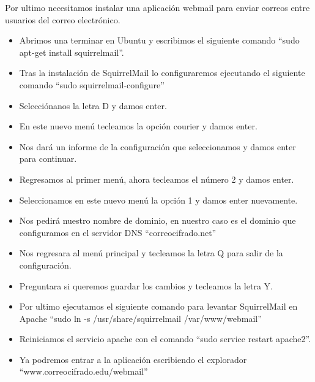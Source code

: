 \documentclass[12pt,oneside,onecolumn,openany]{report}
\begin{document}
Por ultimo necesitamos instalar una aplicación webmail para enviar correos entre usuarios del correo electrónico.
\begin{itemize}
 \item Abrimos una terminar en Ubuntu y escribimos el siguiente comando “sudo apt-get install squirrelmail”.
 \item Tras la instalación de SquirrelMail lo configuraremos ejecutando el siguiente comando “sudo squirrelmail-configure”
 \item Selecciónanos la letra D y damos enter.
 \item En este nuevo menú tecleamos la opción courier y damos enter.
 \item Nos dará un informe de la configuración que seleccionamos y damos enter para continuar.
 \item Regresamos al primer menú, ahora tecleamos el número 2 y damos enter.
 \item Seleccionamos en este nuevo menú la opción 1 y damos enter nuevamente.
 \item Nos pedirá nuestro nombre de dominio, en nuestro caso es el dominio que configuramos en el servidor DNS “correocifrado.net”
 \item Nos regresara al menú principal y tecleamos la letra Q para salir de la configuración.
 \item Preguntara si queremos guardar los cambios y tecleamos la letra Y.
 \item Por ultimo ejecutamos el siguiente comando para levantar SquirrelMail en Apache “sudo ln -s /usr/share/squirrelmail /var/www/webmail”
 \item Reiniciamos el servicio apache con el comando “sudo service restart apache2”.
 \item Ya podremos entrar a la aplicación escribiendo el explorador “www.correocifrado.edu/webmail”
\end{itemize}
\end{document}

